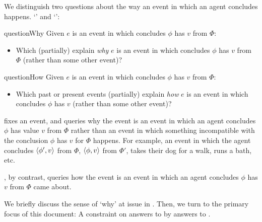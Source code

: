 \begin{note}
  We distinguish two questions about the way an event in which an agent concludes happens.
  `\qWhy{}' and `\qHow{}':

  \begin{question}{questionWhy}{\qWhy{}}
    Given \(e\) is an event in which \vAgent{} concludes \(\phi\) has  \(v\) from \(\Phi\):
    \begin{itemize}
    \item
      Which  (partially) explain \emph{why} \(e\) is an event in which \vAgent{} concludes \(\phi\) has  \(v\) from \(\Phi\) (rather than some other event)?
    \end{itemize}
    \vspace{-1.5\baselineskip}
  \end{question}

  \begin{question}{questionHow}{\qHow{}}
    \label{q:how}
    Given \(e\) is an event in which \vAgent{} concludes \(\phi\) has  \(v\) from \(\Phi\):
    \begin{itemize}
    \item
      Which past or present events (partially) explain \emph{how} \(e\) is an event in which \vAgent{} concludes \(\phi\) has  \(v\) (rather than some other event)?
    \end{itemize}
    \vspace{-1.5\baselineskip}
  \end{question}
\end{note}


\begin{note}
  \qWhy{} fixes an event, and queries why the event is an event in which an agent concludes \(\phi\) has value \(v\) from \(\Phi\) rather than an event in which something incompatible with the conclusion \(\phi\) has  \(v\) for \(\Phi\) happens.
  For example, an event in which the agent concludes \(\langle\phi', v\rangle\) from \(\Phi\), \(\langle\phi, v\rangle\) from \(\Phi'\), takes their dog for a walk, runs a bath, etc.

  \qHow{}, by contrast, queries how the event is an event in which an agent concludes \(\phi\) has  \(v\) from \(\Phi\) came about.
\end{note}

\begin{note}
  We briefly discuss the sense of `why' at issue in \qWhy{}.
  Then, we turn to the primary focus of this document:
  A constraint on answers to \qWhy{} by answers to \qHow{}.
\end{note}


